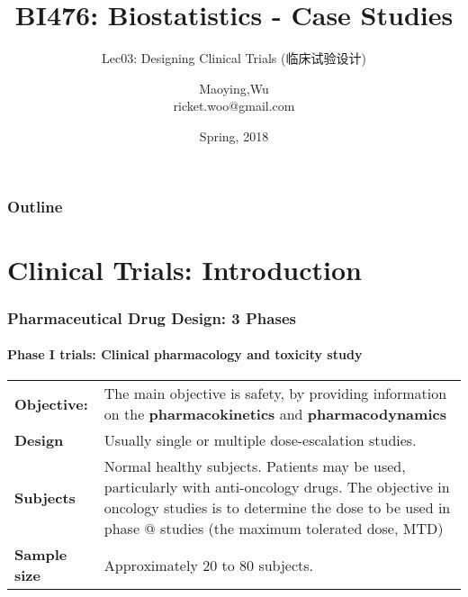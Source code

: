 \documentclass[table,10pt]{beamer}
\title[BI476]{BI476: Biostatistics - Case Studies}
\subtitle[trial]{Lec03: Designing Clinical Trials (临床试验设计)}
\author[Maoying Wu]{Maoying,Wu\\{\small ricket.woo@gmail.com}}
\institute[CBB] %
{
  \inst{}
  Dept. of Bioinformatics \& Biostatistics\\
  Shanghai Jiao Tong University
}
\date{Spring, 2018}
\makeatletter
\newcommand{\Rmnum}[1]{\expandafter\@slowromancap\romannumeral #1@}
\makeatother
\begin{document}
\begin{CJK*}{UTF8}{gbsn}

\frame{\titlepage}

\begin{frame}
\frametitle{Outline}
\tableofcontents
\end{frame}

\section{Clinical Trials: Introduction}

\begin{frame}[t]
\frametitle{Pharmaceutical Drug Design: 3 Phases}
\framesubtitle{Phase I trials: Clinical pharmacology and toxicity study}
\begin{table}
\begin{tabular}{p{}p{}}
\textbf{Objective:} & The main objective is safety, by providing information on the 
	\textbf{pharmacokinetics} and \textbf{pharmacodynamics}\\
\textbf{Design} & Usually single or multiple dose-escalation studies.\\
\textbf{Subjects} & Normal healthy subjects. Patients may be used, particularly with 
	anti-oncology drugs. The objective in oncology studies is to determine the 
	dose to be used in phase \Rmnum{2} studies (the maximum tolerated dose, MTD)\\ 
\textbf{Sample size} & Approximately 20 to 80 subjects.
\end{tabular}
\end{table}
\end{frame}



\end{CJK*}
\end{document}
